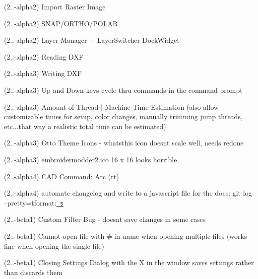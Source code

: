 \begin{DoxyRefList}
\label{todo__todo000234}%
%
(2..-\/alpha2) Import Raster Image

\label{todo__todo000235}%
%
(2..-\/alpha2) SNAP/\+ORTHO/\+POLAR

\label{todo__todo000236}%
%
(2..-\/alpha2) Layer Manager + Layer\+Switcher Dock\+Widget

\label{todo__todo000237}%
%
(2..-\/alpha2) Reading DXF

\label{todo__todo000238}%
%
(2..-\/alpha3) Writing DXF

\label{todo__todo000239}%
%
(2..-\/alpha3) Up and Down keys cycle thru commands in the command prompt

\label{todo__todo000240}%
%
(2..-\/alpha3) Amount of Thread $|$ Machine Time Estimation (also allow customizable times for setup, color changes, manually trimming jump threads, etc...that way a realistic total time can be estimated)

\label{todo__todo000241}%
%
(2..-\/alpha3) Otto Theme Icons -\/ whatsthis icon doesn\textquotesingle{}t scale well, needs redone

\label{todo__todo000242}%
%
(2..-\/alpha3) embroidermodder2.\+ico 16 x 16 looks horrible

\label{todo__todo000243}%
%
(2..-\/alpha4) CAD Command\+: Arc (rt)

\label{todo__todo000244}%
%
(2..-\/alpha4) automate changelog and write to a javascript file for the docs\+: git log --pretty=tformat\+:\textquotesingle{}\href{\\url{https://github.com/Embroidermodder/Embroidermodder/commit/\%H}}{\texttt{ s}}\textquotesingle{}

\label{todo__todo000245}%
%
(2..-\/beta1) Custom Filter Bug -\/ doesn\textquotesingle{}t save changes in some cases

\label{todo__todo000246}%
%
(2..-\/beta1) Cannot open file with {\ttfamily \#} in name when opening multiple files (works fine when opening the single file)

\label{todo__todo000247}%
%
(2..-\/beta1) Closing Settings Dialog with the X in the window saves settings rather than discards them


\end{DoxyRefList}
